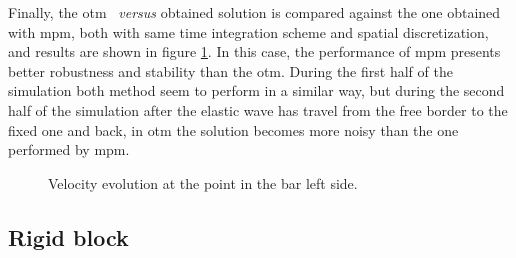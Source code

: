 \documentclass[preprint,12pt,a4paper]{elsarticle}
\begin{document}
Finally, the \acrshort{otm}~\cite{Li2010} \textit{versus} obtained solution is compared against the one obtained with \acrshort{mpm}, both with same time integration scheme and spatial discretization, and results are shown in figure \ref{fig:Dyka-OTM-MPM}. In
this case, the performance of \acrshort{mpm} presents better robustness and stability than the
\acrshort{otm}. During the first half of the simulation both method 
seem to perform in a similar way, but during the second half of the
simulation after the elastic wave has travel from the free border to
the fixed one and back, in \acrshort{otm} the solution becomes more noisy than the
one performed by \acrshort{mpm}.  
\begin{figure}\sidecaption
  \centering
  \caption{Velocity evolution at the point in the bar left side.}
  \label{fig:Dyka-OTM-MPM}
\end{figure}

\clearpage
\subsection{Rigid block}
\label{sec:andersen-block}
\end{document}
